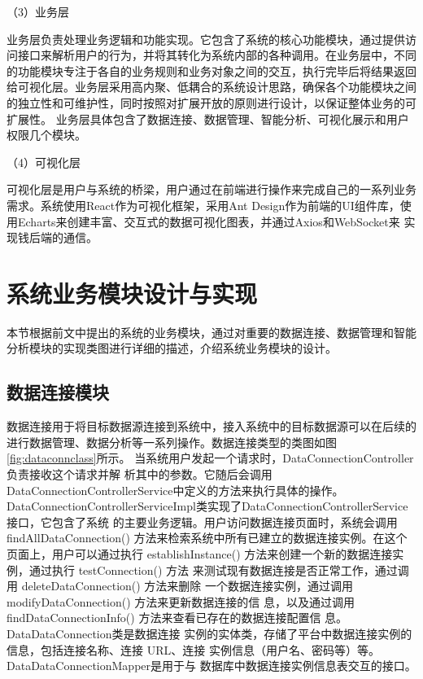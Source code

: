 （3）业务层 

业务层负责处理业务逻辑和功能实现。它包含了系统的核心功能模块，通过提供访问接口来解析用户的行为，并将其转化为系统内部的各种调用。在业务层中，不同的功能模块专注于各自的业务规则和业务对象之间的交互，执行完毕后将结果返回给可视化层。业务层采用高内聚、低耦合的系统设计思路，确保各个功能模块之间的独立性和可维护性，同时按照对扩展开放的原则进行设计，以保证整体业务的可扩展性。
业务层具体包含了数据连接、数据管理、智能分析、可视化展示和用户权限几个模块。

（4）可视化层

可视化层是用户与系统的桥梁，用户通过在前端进行操作来完成自己的一系列业务需求。系统使用React作为可视化框架，采用Ant Design作为前端的UI组件库，使用Echarts来创建丰富、交互式的数据可视化图表，并通过Axios和WebSocket来
实现钱后端的通信。

\section{系统业务模块设计与实现}
本节根据前文中提出的系统的业务模块，通过对重要的数据连接、数据管理和智能分析模块的实现类图进行详细的描述，介绍系统业务模块的设计。
\subsection{数据连接模块}
数据连接用于将目标数据源连接到系统中，接入系统中的目标数据源可以在后续的进行数据管理、数据分析等一系列操作。数据连接类型的类图如图\ref{fig:dataconnclass}所示。
%     
当系统用户发起一个请求时，DataConnectionController负责接收这个请求并解
析其中的参数。它随后会调用DataConnectionControllerService中定义的方法来执行具体的操作。DataConnectionControllerServiceImpl类实现了DataConnectionControllerService接口，它包含了系统
的主要业务逻辑。用户访问数据连接页面时，系统会调用 findAllDataConnection()
方法来检索系统中所有已建立的数据连接实例。在这个页面上，用户可以通过执行
establishInstance() 方法来创建一个新的数据连接实例，通过执行 testConnection() 方法
来测试现有数据连接是否正常工作，通过调用 deleteDataConnection() 方法来删除
一个数据连接实例，通过调用 modifyDataConnection() 方法来更新数据连接的信
息，以及通过调用 findDataConnectionInfo() 方法来查看已存在的数据连接配置信
息。DataDataConnection类是数据连接
实例的实体类，存储了平台中数据连接实例的信息，包括连接名称、连接 URL、连接
实例信息（用户名、密码等）等。DataDataConnectionMapper是用于与
数据库中数据连接实例信息表交互的接口。
